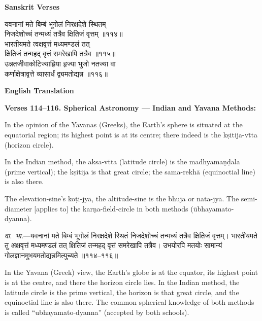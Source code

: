 \documentclass[11pt,a4paper]{article}
\begin{document}
\begin{minipage}[t]{0.48\textwidth}
\textbf{\small Sanskrit Verses}

\small\devanagarifont
यवनानां मते बिम्बं भूगोलं निरक्षदेशे स्थितम्\\
निजदेशोच्चं तन्मध्यं तत्रैव क्षितिजं वृत्तम् ॥११४॥\\[0.5em]
भारतीयमते त्वक्षवृत्तं मध्यमण्डलं तत्\\
क्षितिजं तन्महद् वृत्तं समरेखापि तत्रैव ॥११५॥\\[0.5em]
उन्नतजीवाकोटिज्याह्रिया हृज्या भुजो नतज्या वा\\
कर्णाक्षेत्रावृत्ते व्यासार्धं द्व्यमतोद्यन्न ॥११६॥
\end{minipage}%
\hfill
\begin{minipage}[t]{0.48\textwidth}
\textbf{\small English Translation}

\textbf{Verses 114--116. Spherical Astronomy --- Indian and Yavana Methods:}

In the opinion of the Yavanas (Greeks), the Earth's sphere is situated at the equatorial region; its highest point is at its centre; there indeed is the k\d{s}itija-v\=tta (horizon circle).

In the Indian method, the aksa-v\=tta (latitude circle) is the madhyama\d{n}\d{d}ala (prime vertical); the k\d{s}itija is that great circle; the sama-rekh\=a (equinoctial line) is also there.

The elevation-sine's ko\d{t}i-jy\=a, the altitude-sine is the bhuja or nata-jy\=a. The semi-diameter [applies to] the kar\d{n}a-field-circle in both methods (\=ubhayamato-dyanna).
\end{minipage}

\vspace{0.5em}
\begin{minipage}[t]{0.48\textwidth}
\small\devanagarifont
\textit{वा.~भा.}---यवनानां मते बिम्बं भूगोलं निरक्षदेशे स्थितं निजदेशोच्चं तन्मध्यं तत्रैव क्षितिजं वृत्तम्। भारतीयमते तु अक्षवृत्तं मध्यमण्डलं तत् क्षितिजं तन्महद् वृत्तं समरेखापि तत्रैव। उभयोरपि मतयोः सामान्यं गोलज्ञानमुभयमतोद्यन्नमित्युच्यते ॥११४--११६॥
\end{minipage}%
\hfill
\begin{minipage}[t]{0.48\textwidth}
\small
In the Yavana (Greek) view, the Earth's globe is at the equator, its highest point is at the centre, and there the horizon circle lies. In the Indian method, the latitude circle is the prime vertical, the horizon is that great circle, and the equinoctial line is also there. The common spherical knowledge of both methods is called ``ubhayamato-dyanna'' (accepted by both schools).
\end{minipage}
\end{document}
